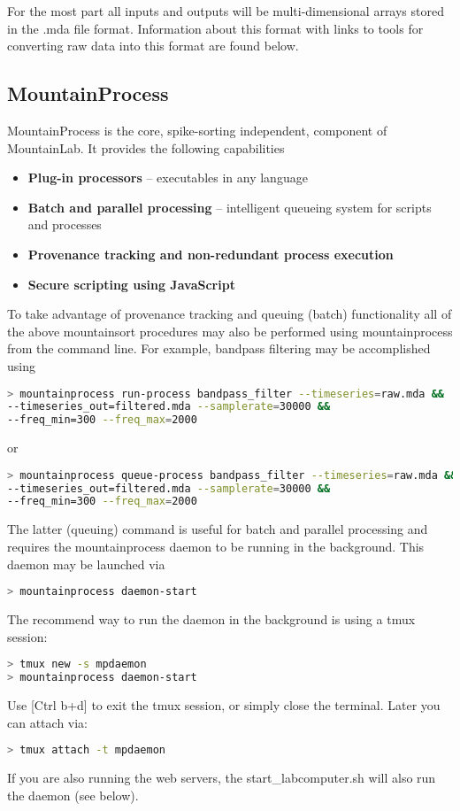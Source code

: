 \documentclass{article}
\begin{document}
For the most part all inputs and outputs will be multi-dimensional arrays stored in the .mda file format. Information about this format with links to tools for converting raw data into this format are found below.

\subsection{MountainProcess}

MountainProcess is the core, spike-sorting independent, component of MountainLab. It provides the following capabilities
\begin{itemize}
\item{\textbf{Plug-in processors} -- executables in any language}
\item{\textbf{Batch and parallel processing} -- intelligent queueing system for scripts and processes}
\item{\textbf{Provenance tracking and non-redundant process execution}}
\item{\textbf{Secure scripting using JavaScript}}
\end{itemize}

To take advantage of provenance tracking and queuing (batch) functionality all of the above mountainsort procedures may also be performed using mountainprocess from the command line. For example, bandpass filtering may be accomplished using
\begin{lstlisting}[language=bash]
> mountainprocess run-process bandpass_filter --timeseries=raw.mda &&
--timeseries_out=filtered.mda --samplerate=30000 &&
--freq_min=300 --freq_max=2000
\end{lstlisting}
or
\begin{lstlisting}[language=bash]
> mountainprocess queue-process bandpass_filter --timeseries=raw.mda &&
--timeseries_out=filtered.mda --samplerate=30000 &&
--freq_min=300 --freq_max=2000
\end{lstlisting}

The latter (queuing) command is useful for batch and parallel processing and requires the mountainprocess daemon to be running in the background. This daemon may be launched via
\begin{lstlisting}[language=bash]
> mountainprocess daemon-start
\end{lstlisting}
The recommend way to run the daemon in the background is using a tmux session:
\begin{lstlisting}[language=bash]
> tmux new -s mpdaemon
> mountainprocess daemon-start
\end{lstlisting}
Use [Ctrl b+d] to exit the tmux session, or simply close the terminal. Later you can attach via:
\begin{lstlisting}[language=bash]
> tmux attach -t mpdaemon
\end{lstlisting}
If you are also running the web servers, the start\_labcomputer.sh will also run the daemon (see below).
\end{document}
